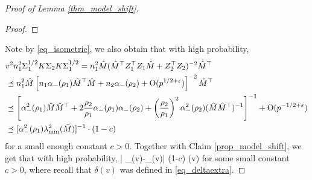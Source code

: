 \begin{proof}[Proof of Lemma \ref{thm_model_shift}]
\begin{proof}
\end{proof}
Note by \eqref{eq_isometric}, we also obtain that with high probability,
\begin{align*}
&v^2 n_1^2 \Sigma_1^{1/2} K \Sigma_2 K \Sigma_1^{1/2} =n_1^2 \hat M (\hat M^\top Z_1^\top Z_1 \hat M + Z_2^\top Z_2)^{-2}\hat M^\top \\
&\preceq  n_1^2 \hat M \left[n_1 \alpha_-(\rho_1)\hat M^\top \hat M + n_2 \alpha_-(\rho_2) + \operatorname{O}(p^{1/2+{\varepsilon}})\right]^{-2}\hat M^\top \\
&\preceq  \left[ \alpha_-^2(\rho_1) \hat M\hat M^\top + 2\frac{\rho_2}{\rho_1} \alpha_-(\rho_1)\alpha_-(\rho_2) + \left(\frac{\rho_2}{\rho_1}\right)^2 \alpha_-^2(\rho_2) (\hat M \hat M^\top )^{-1}\right]^{-1}+  \operatorname{O}(p^{-1/2+{\varepsilon}}) \\
&\preceq [\alpha_-^2(\rho_1) \lambda_{\min}^2(\hat M)]^{-1}\cdot (1 - c)
\end{align*}
for a small enough constant $c>0$. Together with Claim \ref{prop_model_shift}, we get that with high probability,
\be\label{bounddelta-}
\left| \delta_{\bias}(v)-\wt\delta_{\bias}(v)\right| 
		\le (1-c) \delta(v)
\ee
for some small constant $c>0$, where recall that $\delta(v)$ was defined in \eqref{eq_deltaextra}.



\end{proof}
